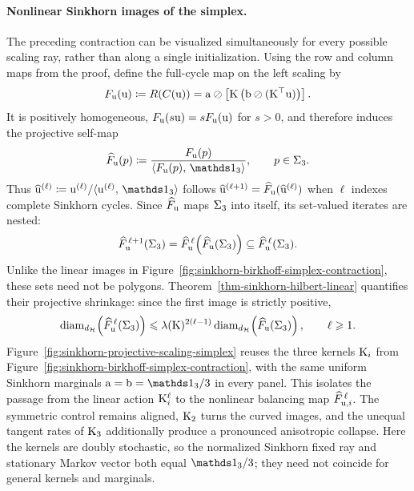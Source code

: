 \paragraph{Nonlinear Sinkhorn images of the simplex.}
The preceding contraction can be visualized simultaneously for every possible scaling ray, rather than along a single initialization. Using the row and column maps from the proof, define the full-cycle map on the left scaling by
\[
	F_{\mathrm{u}}(\mathrm{u})
	\coloneqq
	R(C(\mathrm{u}))
	=
	\mathrm{a}\oslash\left[\mathrm{K}\left(\mathrm{b}\oslash(\mathrm{K}^\top\mathrm{u})\right)\right].
\]
It is positively homogeneous, $F_{\mathrm{u}}(s\mathrm{u})=sF_{\mathrm{u}}(\mathrm{u})$ for $s>0$, and therefore induces the projective self-map
\[
	\widehat F_{\uD}(p)
	\eqdef
	\frac{F_{\uD}(p)}{\dotp{F_{\uD}(p)}{\ones_3}},
	\qquad p\in\simplex_3.
\]
Thus $\widehat\uD^{(\ell)}\eqdef\uD^{(\ell)}/\dotp{\uD^{(\ell)}}{\ones_3}$ follows
$\widehat{\mathrm{u}}^{(\ell+1)}=\widehat F_{\mathrm{u}}(\widehat{\mathrm{u}}^{(\ell)})$ when $\ell$ indexes complete Sinkhorn cycles. Since $\widehat F_{\mathrm{u}}$ maps $\Sigma_3$ into itself, its set-valued iterates are nested:
\[
	\widehat F_{\mathrm{u}}^{\,\ell+1}(\Sigma_3)
	=
	\widehat F_{\mathrm{u}}^{\,\ell}\!\left(\widehat F_{\mathrm{u}}(\Sigma_3)\right)
	\subseteq
	\widehat F_{\mathrm{u}}^{\,\ell}(\Sigma_3).
\]
Unlike the linear images in Figure~\ref{fig:sinkhorn-birkhoff-simplex-contraction}, these sets need not be polygons. Theorem~\ref{thm-sinkhorn-hilbert-linear} quantifies their projective shrinkage: since the first image is strictly positive,
\[
	\operatorname{diam}_{d_{\mathcal{H}}}\!\left(\widehat F_{\mathrm{u}}^{\,\ell}(\Sigma_3)\right)
	\leqslant
	\lambda(\mathrm{K})^{2(\ell-1)}
	\operatorname{diam}_{d_{\mathcal{H}}}\!\left(\widehat F_{\mathrm{u}}(\Sigma_3)\right),
	\qquad \ell\geqslant1.
\]
Figure~\ref{fig:sinkhorn-projective-scaling-simplex} reuses the three kernels $\mathrm{K}_i$ from Figure~\ref{fig:sinkhorn-birkhoff-simplex-contraction}, with the same uniform Sinkhorn marginals $\a=\b=\ones_3/3$ in every panel. This isolates the passage from the linear action $\mathrm{K}_i^\ell$ to the nonlinear balancing map $\widehat F_{\mathrm{u},i}^{\,\ell}$. The symmetric control remains aligned, $\mathrm{K}_2$ turns the curved images, and the unequal tangent rates of $\mathrm{K}_3$ additionally produce a pronounced anisotropic collapse. Here the kernels are doubly stochastic, so the normalized Sinkhorn fixed ray and stationary Markov vector both equal $\ones_3/3$; they need not coincide for general kernels and marginals.

